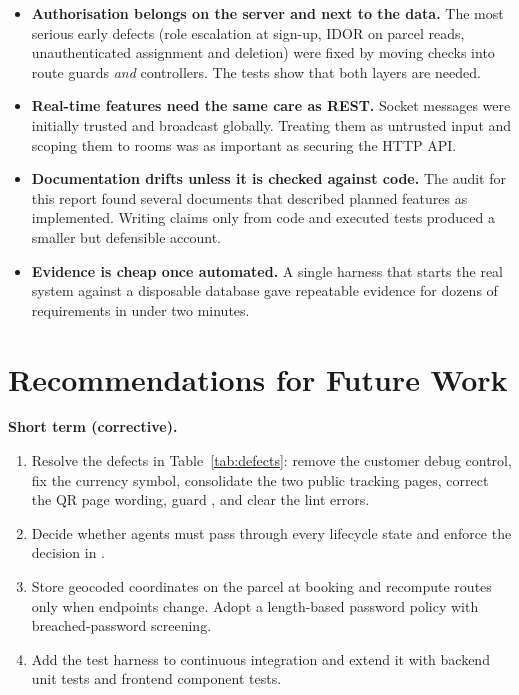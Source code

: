 \begin{itemize}
  \item \textbf{Authorisation belongs on the server and next to the data.} The most serious early defects (role escalation at sign-up, IDOR on parcel reads, unauthenticated assignment and deletion) were fixed by moving checks into route guards \emph{and} controllers. The tests show that both layers are needed.
  \item \textbf{Real-time features need the same care as REST.} Socket messages were initially trusted and broadcast globally. Treating them as untrusted input and scoping them to rooms was as important as securing the HTTP API.
  \item \textbf{Documentation drifts unless it is checked against code.} The audit for this report found several documents that described planned features as implemented. Writing claims only from code and executed tests produced a smaller but defensible account.
  \item \textbf{Evidence is cheap once automated.} A single harness that starts the real system against a disposable database gave repeatable evidence for dozens of requirements in under two minutes.
\end{itemize}

\section{Recommendations for Future Work}

\textbf{Short term (corrective).}
\begin{enumerate}
  \item Resolve the defects in Table~\ref{tab:defects}: remove the customer debug control, fix the currency symbol, consolidate the two public tracking pages, correct the QR page wording, guard , and clear the lint errors.
  \item Decide whether agents must pass through every lifecycle state and enforce the decision in .
  \item Store geocoded coordinates on the parcel at booking and recompute routes only when endpoints change. Adopt a length-based password policy with breached-password screening.
  \item Add the test harness to continuous integration and extend it with backend unit tests and frontend component tests.
\end{enumerate}

